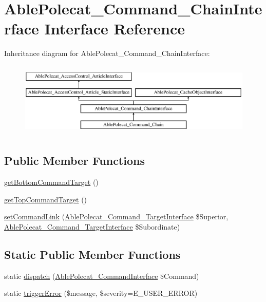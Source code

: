 \hypertarget{interface_able_polecat___command___chain_interface}{}\section{Able\+Polecat\+\_\+\+Command\+\_\+\+Chain\+Interface Interface Reference}
\label{interface_able_polecat___command___chain_interface}
Inheritance diagram for Able\+Polecat\+\_\+\+Command\+\_\+\+Chain\+Interface\+:\begin{figure}[H]
\begin{center}
\leavevmode
\includegraphics[height=3.612903cm]{interface_able_polecat___command___chain_interface}
\end{center}
\end{figure}
\subsection*{Public Member Functions}
\begin{DoxyCompactItemize}
\item 
\hyperlink{interface_able_polecat___command___chain_interface_af7a918af43e7bf03f9b815c0d9cb4ff4}{get\+Bottom\+Command\+Target} ()
\item 
\hyperlink{interface_able_polecat___command___chain_interface_ae62d6679a43700f22fda4d1613a3c2ce}{get\+Top\+Command\+Target} ()
\item 
\hyperlink{interface_able_polecat___command___chain_interface_acb3b9b68b805ffd1619966a5ed7c0a39}{set\+Command\+Link} (\hyperlink{interface_able_polecat___command___target_interface}{Able\+Polecat\+\_\+\+Command\+\_\+\+Target\+Interface} \$Superior, \hyperlink{interface_able_polecat___command___target_interface}{Able\+Polecat\+\_\+\+Command\+\_\+\+Target\+Interface} \$Subordinate)
\end{DoxyCompactItemize}
\subsection*{Static Public Member Functions}
\begin{DoxyCompactItemize}
\item 
static \hyperlink{interface_able_polecat___command___chain_interface_a8c95906f06450a060c5c9f0dc5b64fb5}{dispatch} (\hyperlink{interface_able_polecat___command_interface}{Able\+Polecat\+\_\+\+Command\+Interface} \$Command)
\item 
static \hyperlink{interface_able_polecat___command___chain_interface_a797ad7554e54abd2e572ae912eae9c70}{trigger\+Error} (\$message, \$severity=E\+\_\+\+U\+S\+E\+R\+\_\+\+E\+R\+R\+O\+R)
\end{DoxyCompactItemize}


